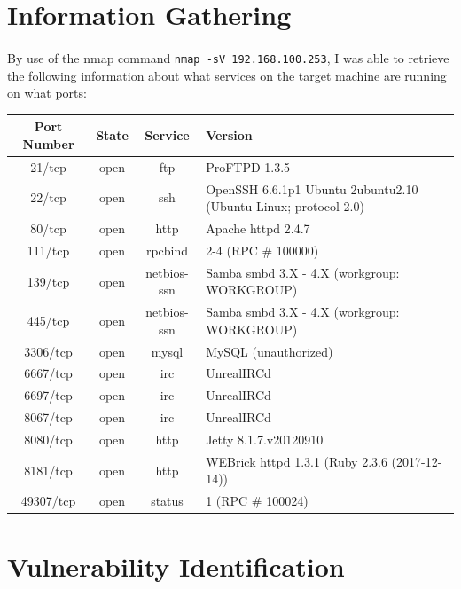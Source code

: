 \documentclass{article}
\begin{document}
\newpage

\section{Information Gathering}
\paragraph{}
By use of the nmap command \texttt{nmap -sV 192.168.100.253}, I was able to retrieve the following information about what services on the target machine are running on what ports:
\newline
\newline

\begin{adjustwidth}{-2cm}{}
\begin{tabular}{ |c|c|c|l| }
\hline
Port Number & State & Service & Version \\
\hline
21/tcp & open & ftp & ProFTPD 1.3.5 \\
\hline
22/tcp & open & ssh & OpenSSH 6.6.1p1 Ubuntu 2ubuntu2.10 (Ubuntu Linux; protocol 2.0) \\
\hline
80/tcp & open & http & Apache httpd 2.4.7 \\
\hline
111/tcp & open & rpcbind & 2-4 (RPC \# 100000) \\
\hline
139/tcp & open & netbios-ssn & Samba smbd 3.X - 4.X (workgroup: WORKGROUP) \\
\hline
445/tcp & open & netbios-ssn & Samba smbd 3.X - 4.X (workgroup: WORKGROUP) \\
\hline
3306/tcp & open & mysql & MySQL (unauthorized) \\
\hline
6667/tcp & open & irc & UnrealIRCd \\
\hline
6697/tcp & open & irc & UnrealIRCd \\
\hline
8067/tcp & open & irc & UnrealIRCd \\
\hline
8080/tcp & open & http & Jetty 8.1.7.v20120910 \\
\hline
8181/tcp & open & http & WEBrick httpd 1.3.1 (Ruby 2.3.6 (2017-12-14)) \\
\hline
49307/tcp & open & status & 1 (RPC \# 100024) \\
\hline
\end{tabular}
\end{adjustwidth}

\newpage

\section{Vulnerability Identification}
\end{document}
